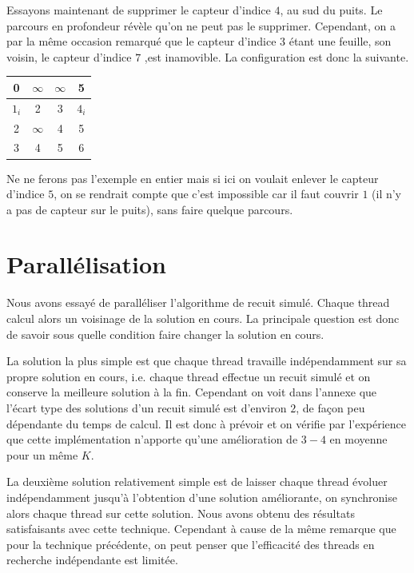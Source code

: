 \documentclass[12pt,a4paper]{article}
\begin{document}
Essayons maintenant de supprimer le capteur d'indice $4$, au sud du puits. Le parcours en profondeur révèle qu'on ne peut pas le supprimer. Cependant, on a par la même occasion remarqué que le capteur d'indice $3$ étant une feuille, son voisin, le capteur d'indice $7$ ,est inamovible. La configuration est donc la suivante.

\begin{center}
\begin{tabular}{|c|c|c|c|}
\hline 
0 & $\infty$ & $\infty$ & 5 \\ 
\hline 
$1_i$ & 2 & 3 & $4_i$ \\ 
\hline 
2 & $\infty$ & 4 & 5 \\ 
\hline 
3 & 4 & 5 & 6 \\ 
\hline 

\end{tabular} 
\end{center}

Ne ne ferons pas l'exemple en entier mais si ici on voulait enlever le capteur d'indice $5$, on se rendrait compte que c'est impossible car il faut couvrir $1$ (il n'y a pas de capteur sur le puits), sans faire quelque parcours.
\section{Parallélisation}
Nous avons essayé de paralléliser l'algorithme de recuit simulé. Chaque thread calcul alors un voisinage de la solution en cours. La principale question est donc de savoir sous quelle condition faire changer la solution en cours. 

La solution la plus simple est que chaque thread travaille indépendamment sur sa propre solution en cours, i.e. chaque thread effectue un recuit simulé et on conserve la meilleure solution à la fin. Cependant on voit dans l'annexe que l'écart type des solutions d'un recuit simulé est d'environ $2$, de façon peu dépendante du temps de calcul. Il est donc à prévoir et on vérifie par l'expérience que cette implémentation n'apporte qu'une amélioration de $3-4$ en moyenne pour un même $K$.

La deuxième solution relativement simple est de laisser chaque thread évoluer indépendamment jusqu'à l'obtention d'une solution améliorante, on synchronise alors chaque thread sur cette solution. Nous avons obtenu des résultats satisfaisants avec cette technique. Cependant à cause de la même remarque que pour la technique précédente, on peut penser que l'efficacité des threads en recherche indépendante est limitée.
\end{document}
